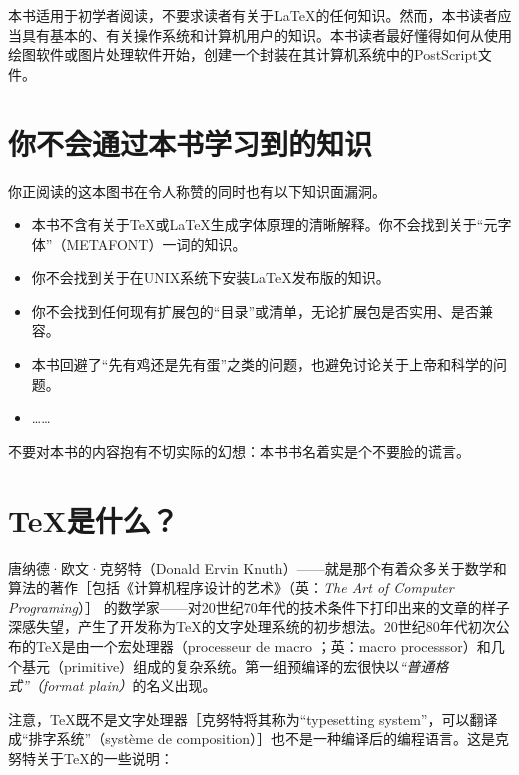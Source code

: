 本书适用于初学者阅读，不要求读者有关于\LaTeX 的任何知识。然而，本书读者应当具有基本的、有关操作系统和计算机用户的知识。本书读者最好懂得如何从使用绘图软件或图片处理软件开始，创建一个封装在其计算机系统中的PostScript文件。

\section*{你不会通过本书学习到的知识}

你正阅读的这本图书在令人称赞的同时也有以下知识面漏洞。

\begin{itemize}
    \item 本书不含有关于\TeX 或\LaTeX 生成字体原理的清晰解释。你不会找到关于“元字体”（METAFONT）一词的知识。
    \item 你不会找到关于在UNIX系统下安装\LaTeX 发布版的知识。
    \item 你不会找到任何现有扩展包的“目录”或清单，无论扩展包是否实用、是否兼容。
    \item 本书回避了“先有鸡还是先有蛋”之类的问题，也避免讨论关于上帝和科学的问题。
    \item ……
\end{itemize}

\begin{exclamation}

不要对本书的内容抱有不切实际的幻想：本书书名着实是个不要脸的谎言。

\end{exclamation}

\section*{\TeX 是什么？}

唐纳德·欧文·克努特（Donald Ervin Knuth）——就是那个有着众多关于数学和算法的著作［包括《计算机程序设计的艺术》（英：\textit{The Art of Computer Programing}）］%
的数学家——对20世纪70年代的技术条件下打印出来的文章的样子深感失望，产生了开发称为\TeX 的文字处理系统的初步想法。20世纪80年代初次公布的\TeX 是由一个宏处理器（processeur de macro ；英：macro processsor）和几个基元（primitive）组成的复杂系统。第一组预编译的宏很快以\textit{“普通格式”（format plain）}的名义出现。

注意，\TeX 既不是文字处理器［克努特将其称为“typesetting system”，可以翻译成“排字系统”（système de composition）］也不是一种编译后的编程语言。这是克努特关于\TeX 的一些说明：

